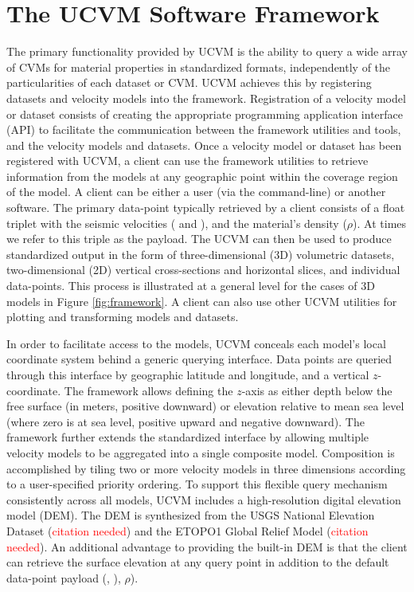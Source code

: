 






\section{The UCVM Software Framework}\label{sec:ucvm}

The primary functionality provided by UCVM is the ability to query a wide array of CVMs for material properties in standardized formats, independently of the particularities of each dataset or CVM. UCVM achieves this by registering datasets and velocity models into the framework. Registration of a velocity model or dataset consists of creating the appropriate programming application interface (API) to facilitate the communication between the framework utilities and tools, and the velocity models and datasets. Once a velocity model or dataset has been registered with UCVM, a client can use the framework utilities to retrieve information from the models at any geographic point within the coverage region of the model. A client can be either a user (via the command-line) or another software. The primary data-point typically retrieved by a client consists of a float triplet with the seismic velocities (\vp{} and \vs{}), and the material's density ($\rho$). At times we refer to this triple as the payload. The UCVM can then be used to produce standardized output in the form of three-dimensional (3D) volumetric datasets, two-dimensional (2D) vertical cross-sections and horizontal slices, and individual data-points. This process is illustrated at a general level for the cases of 3D models in Figure \ref{fig:framework}. A client can also use other UCVM utilities for plotting and transforming models and datasets.

In order to facilitate access to the models, UCVM conceals each model's local coordinate system behind a generic querying interface. Data points are queried through this interface by geographic latitude and longitude, and a vertical $z$-coordinate. The framework allows defining the $z$-axis as either depth below the free surface (in meters, positive downward) or elevation relative to mean sea level (where zero is at sea level, positive upward and negative downward). The framework further extends the standardized interface by allowing multiple velocity models to be aggregated into a single composite model. Composition is accomplished by tiling two or more velocity models in three dimensions according to a user-specified priority ordering. To support this flexible query mechanism consistently across all models, UCVM includes a high-resolution digital elevation model (DEM). The DEM is synthesized from the USGS National Elevation Dataset (\textcolor{red}{citation needed}) and the ETOPO1 Global Relief Model (\textcolor{red}{citation needed}). An additional advantage to providing the built-in DEM is that the client can retrieve the surface elevation at any query point in addition to the default data-point payload (\vp{}, \vs{}), $\rho$).


